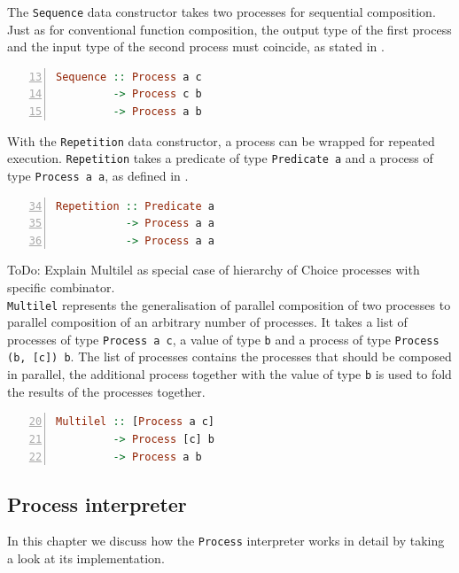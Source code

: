 The \texttt{Sequence} data constructor takes two processes for sequential composition. Just as for conventional function composition, the output type of the first process and the input type of the second process must coincide, as stated in .
\begin{lstlisting}[language=Haskell,caption=Signature of the \texttt{Seqeuence} data constructor.,numbers=left,frame=bt,firstnumber=13]
Sequence :: Process a c
         -> Process c b
         -> Process a b
\end{lstlisting}

With the \texttt{Repetition} data constructor, a process can be wrapped for repeated execution. \texttt{Repetition} takes a predicate of type \texttt{Predicate a} and a process of type \texttt{Process a a}, as defined in .
\begin{lstlisting}[language=Haskell,caption=Signature of the \texttt{Repetition} data constructor.,numbers=left,frame=bt,firstnumber=34]
Repetition :: Predicate a
           -> Process a a
           -> Process a a
\end{lstlisting}

ToDo: Explain Multilel as special case of hierarchy of Choice processes with specific combinator.\\
\texttt{Multilel} represents the generalisation of parallel composition of two processes to parallel composition of an arbitrary number of processes. It takes a list of processes of type \texttt{Process a c}, a value of type \texttt{b} and a process of type \texttt{Process (b, [c]) b}. The list of processes contains the processes that should be composed in parallel, the additional process together with the value of type \texttt{b} is used to fold the results of the processes together.
\begin{lstlisting}[language=Haskell,caption=Signature of the \texttt{Multilel} data constructor.,numbers=left,frame=bt,firstnumber=20]
Multilel :: [Process a c]
         -> Process [c] b
         -> Process a b
\end{lstlisting}

\subsection{Process interpreter}
In this chapter we discuss how the \texttt{Process} interpreter works in detail by taking a look at its implementation.

